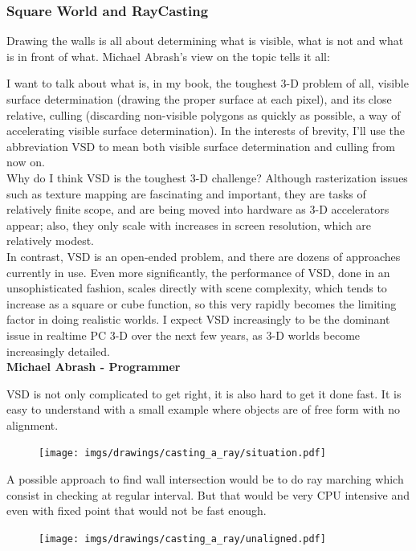 \subsubsection{Square World and RayCasting}
Drawing the walls is all about determining what is visible, what is not and what is in front of what. Michael Abrash's view on the topic tells it all:\\
\par
\begin{fancyquotes}
I want to talk about what is, in my book, the toughest 3-D problem of all, visible surface determination (drawing the proper surface at each pixel), and its close relative, culling (discarding non-visible polygons as quickly as possible, a way of accelerating visible surface determination). In the interests of brevity, I’ll use the abbreviation VSD to mean both visible surface determination and culling from now on.
 \bigskip \\
Why do I think VSD is the toughest 3-D challenge? Although rasterization issues such as texture mapping are fascinating and important, they are tasks of relatively finite scope, and are being moved into hardware as 3-D accelerators appear; also, they only scale with increases in screen resolution, which are relatively modest.
 \bigskip \\
In contrast, VSD is an open-ended problem, and there are dozens of approaches currently in use. Even more significantly, the performance of VSD, done in an unsophisticated fashion, scales directly with scene complexity, which tends to increase as a square or cube function, so this very rapidly becomes the limiting factor in doing realistic worlds. I expect VSD increasingly to be the dominant issue in realtime PC 3-D over the next few years, as 3-D worlds become increasingly detailed.
 \bigskip \\
\textbf{Michael Abrash - Programmer}
 \end{fancyquotes}
 \par
VSD is not only complicated to get right, it is also hard to get it done fast. It is easy to understand with a small example where objects are of free form with no alignment.

\par
\begin{figure}[H]
\centering
\texttt{[image: imgs/drawings/casting\_a\_ray/situation.pdf]}
\end{figure}


A possible approach to find wall intersection would be to do ray marching which consist in checking at regular interval. But that would be very CPU intensive and even with fixed point that would not be fast enough.
\begin{figure}[H]
\centering
\texttt{[image: imgs/drawings/casting\_a\_ray/unaligned.pdf]}
\end{figure}


